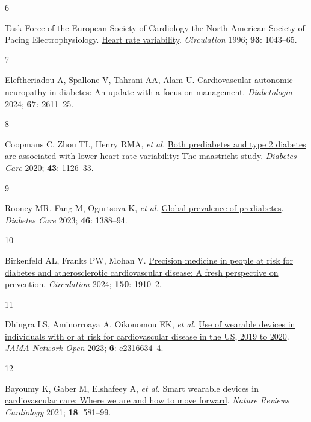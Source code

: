 \documentclass[
  a4paper,
  headsepline=true,
  open=any]{scrbook}
\newlength{\cslhangindent}
\newlength{\csllabelwidth}
\newlength{\cslentryspacingunit} %
\newenvironment{CSLReferences}[2] %
 {%
  \setlength{\parindent}{0pt}
  \ifodd #1
  \let\oldpar\par
  \def\par{\hangindent=\cslhangindent\oldpar}
  \fi
  \setlength{\parskip}{#2\cslentryspacingunit}
 }%
 {}
\newcommand{\CSLLeftMargin}[1]{\parbox[t]{\csllabelwidth}{#1}}
\newcommand{\CSLRightInline}[1]{\parbox[t]{\linewidth - \csllabelwidth}{#1}\break}
\begin{document}
\begin{CSLReferences}{0}{0}
\leavevmode{}%
\CSLLeftMargin{6 }%
\CSLRightInline{Task Force of the European Society of Cardiology the
North American Society of Pacing Electrophysiology.
\href{https://doi.org/doi:10.1161/01.CIR.93.5.1043}{Heart rate
variability}. \emph{Circulation} 1996; \textbf{93}: 1043--65.}

\leavevmode{}%
\CSLLeftMargin{7 }%
\CSLRightInline{Eleftheriadou A, Spallone V, Tahrani AA, Alam U.
\href{https://doi.org/10.1007/s00125-024-06242-0}{Cardiovascular
autonomic neuropathy in diabetes: An update with a focus on management}.
\emph{Diabetologia} 2024; \textbf{67}: 2611--25.}

\leavevmode{}%
\CSLLeftMargin{8 }%
\CSLRightInline{Coopmans C, Zhou TL, Henry RMA, \emph{et al.}
\href{https://doi.org/10.2337/dc19-2367}{Both prediabetes and type 2
diabetes are associated with lower heart rate variability: The
maastricht study}. \emph{Diabetes Care} 2020; \textbf{43}: 1126--33.}

\leavevmode{}%
\CSLLeftMargin{9 }%
\CSLRightInline{Rooney MR, Fang M, Ogurtsova K, \emph{et al.}
\href{https://doi.org/10.2337/dc22-2376}{Global prevalence of
prediabetes}. \emph{Diabetes Care} 2023; \textbf{46}: 1388--94.}

\leavevmode{}%
\CSLLeftMargin{10 }%
\CSLRightInline{Birkenfeld AL, Franks PW, Mohan V.
\href{https://doi.org/10.1161/CIRCULATIONAHA.124.070463}{Precision
medicine in people at risk for diabetes and atherosclerotic
cardiovascular disease: A fresh perspective on prevention}.
\emph{Circulation} 2024; \textbf{150}: 1910--2.}

\leavevmode{}%
\CSLLeftMargin{11 }%
\CSLRightInline{Dhingra LS, Aminorroaya A, Oikonomou EK, \emph{et al.}
\href{https://doi.org/10.1001/jamanetworkopen.2023.16634}{Use of
wearable devices in individuals with or at risk for cardiovascular
disease in the US, 2019 to 2020}. \emph{JAMA Network Open} 2023;
\textbf{6}: e2316634--4.}

\leavevmode{}%
\CSLLeftMargin{12 }%
\CSLRightInline{Bayoumy K, Gaber M, Elshafeey A, \emph{et al.}
\href{https://doi.org/10.1038/s41569-021-00522-7}{Smart wearable devices
in cardiovascular care: Where we are and how to move forward}.
\emph{Nature Reviews Cardiology} 2021; \textbf{18}: 581--99.}


\end{CSLReferences}
\end{document}
